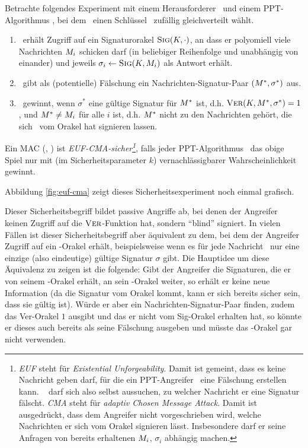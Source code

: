 \begin{definition} Betrachte folgendes Experiment mit einem
  Herausforderer \C~und einem PPT-Algorithmus \A, bei dem \C~einen
  Schlüssel \key~zufällig gleichverteilt wählt.
  \begin{enumerate}
  \item \A~erhält Zugriff auf ein Signaturorakel $\textsc{Sig}(K,\cdot)$, an
    dass er polyomiell viele Nachrichten $M_i$ schicken darf (in
    beliebiger Reihenfolge und unabhängig von einander) und jeweils
    $\sigma_i \leftarrow \textsc{Sig}(K, M_i)$ als Antwort erhält.
  \item \A~gibt als (potentielle) Fälschung ein Nachrichten-Signatur-Paar
    $(M^*,\sigma^*)$ aus.
  \item \A~gewinnt, wenn $\sigma^*$ eine gültige Signatur für $M^*$
    ist, d.h. $\textsc{Ver}(K, M^*, \sigma^*)=1$, und $M^* \neq
    M_i$ für alle $i$ ist, d.h. $M^*$ nicht zu den Nachrichten
    gehört, die sich \A~vom Orakel hat signieren lassen.
  \end{enumerate}
\end{definition}

Ein MAC (\sig, \ver) ist \textit{EUF-CMA-sicher\footnote{\textit{EUF}
    \indexEUFCMA steht für \textit{Existential Unforgeability}. Damit ist
    gemeint, dass es keine Nachricht geben darf, für die ein PPT-Angreifer
    \A~eine Fälschung erstellen kann. \A~ darf sich also selbst aussuchen,
    zu welcher Nachricht er eine Signatur fälscht. \textit{CMA} steht für
    \textit{adaptiv Chosen Message Attack}. Damit ist ausgedrückt, dass dem
    Angreifer nicht vorgeschrieben wird, welche Nachrichten er sich vom
    Orakel signieren lässt. Insbesondere darf er seine Anfragen von bereits
    erhaltenen $M_i$, $\sigma_i$ abhängig machen.}}, falls jeder
PPT-Algorithmus \A~das obige Spiel nur mit (im Sicherheitsparameter $k$)
vernachlässigbarer Wahrscheinlichkeit gewinnt.

Abbildung \ref{fig:euf-cma} zeigt dieses Sicherheitsexperiment noch
einmal grafisch.

Dieser Sicherheitsbegriff bildet passive Angriffe ab, bei denen der
Angreifer keinen Zugriff auf die $\textsc{Ver}$-Funktion hat, sondern "`blind"'
signiert. In vielen Fällen ist dieser Sicherheitsbegriff aber äquivalent
zu dem, bei dem der Angreifer Zugriff auf ein \ver-Orakel erhält,
beispielsweise wenn es für jede Nachricht \plaint~nur eine einzige (also
eindeutige) gültige Signatur $\sigma$ gibt. Die Hauptidee um diese
Äquivalenz zu zeigen ist die folgende: Gibt der Angreifer die
Signaturen, die er von seinem \sig-Orakel erhält, an sein \ver-Orakel
weiter, so erhält er keine neue Information (da die Signatur vom Orakel
kommt, kann er sich bereits sicher sein, dass sie gültig ist). Würde er
aber ein Nachrichten-Signatur-Paar finden, zudem das Ver-Orakel $1$
ausgibt und das er nicht vom Sig-Orakel erhalten hat, so könnte er
dieses auch bereits als seine Fälschung ausgeben und müsste das
\ver-Orakel gar nicht verwenden.


